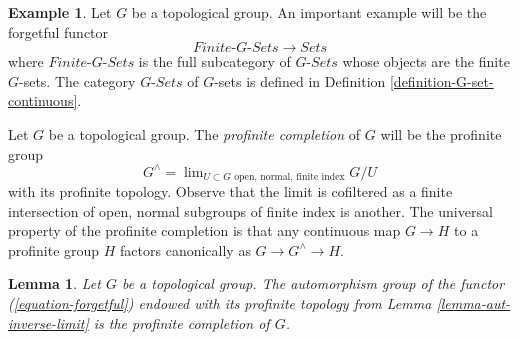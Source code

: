 \documentclass{stacks-project}
\theoremstyle{plain}
\newtheorem{lemma}[subsection]{Lemma}
\theoremstyle{definition}
\newtheorem{example}[subsection]{Example}
\theoremstyle{remark}
\numberwithin{equation}{subsection}
\def\lim{\mathop{\mathrm{lim}}\nolimits}
\begin{document}
\begin{example}
\label{example-galois-category-G-sets}
Let $G$ be a topological group. An important example will be the
forgetful functor
\begin{equation}
\label{equation-forgetful}
\textit{Finite-}G\textit{-Sets} \longrightarrow \textit{Sets}
\end{equation}
where $\textit{Finite-}G\textit{-Sets}$ is the full subcategory of
$G\textit{-Sets}$ whose objects are the finite $G$-sets.
The category $G\textit{-Sets}$ of $G$-sets is defined in
Definition \ref{definition-G-set-continuous}.
\end{example}

\noindent
Let $G$ be a topological group. The {\it profinite completion} of $G$
will be the profinite group
$$
G^\wedge =
\lim_{U \subset G\text{ open, normal, finite index}} G/U
$$
with its profinite topology. Observe that the limit is cofiltered
as a finite intersection of open, normal subgroups of finite index
is another. The universal property of the profinite completion is
that any continuous map $G \to H$ to a profinite group $H$ factors
canonically as $G \to G^\wedge \to H$.

\begin{lemma}
\label{lemma-single-out-profinite}
Let $G$ be a topological group. The automorphism group of the functor
(\ref{equation-forgetful}) endowed with its profinite topology from
Lemma \ref{lemma-aut-inverse-limit} is the profinite completion of $G$.
\end{lemma}
\end{document}
